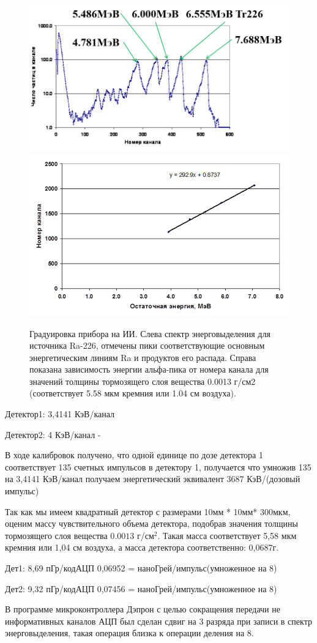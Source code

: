 \begin{figure}
	\centering
	\includegraphics[width=0.49\linewidth]{images/kalibr2}
	\includegraphics[width=0.49\linewidth]{images/kalibr3}
	\caption[Градуировка прибора на ИИ]{Градуировка прибора на ИИ. Слева спектр энерговыделения для источника Ra-226, отмечены пики соответствующие основным энергетическим линиям Ra и продуктов его распада. Справа показана зависимость энергии альфа-пика от номера канала для значений толщины тормозящего слоя вещества 0.0013 г/см2 (соответствует 5.58 мкм кремния или 1.04 см воздуха).	}
	\label{fig:kalibr2}
\end{figure}
Детектор1: 3,4141 КэВ/канал 

Детектор2: 4 КэВ/канал -%





В ходе калибровок получено, что одной единице по дозе детектора 1 соответствует 135 счетных импульсов в детектору 1, получается что умножив 135 на 3,4141  КэВ/канал  получаем энергетический эквивалент 3687 КэВ/(дозовый импульс) 

Так как мы имеем квадратный детектор с размерами 10мм * 10мм* 300мкм, оценим массу чувствительного объема детектора, подобрав значения толщины тормозящего слоя вещества $ 0.0013 $ г/см$^2 $. Такая масса соответствует 5,58 мкм кремния или 1,04 см воздуха, а масса детектора соответственно: 0,0687г.

Дет1: 8,69 пГр/кодАЦП  0,06952 = наноГрей/импульс(умноженное на 8)

Дет2: 9,32 пГр/кодАЦП  0,07456 = наноГрей/импульс(умноженное на 8)


В программе микроконтроллера Дэпрон с целью сокращения передачи не информативных 
каналов АЦП был сделан сдвиг на 3 разряда при записи в спектр энерговыделения, 
такая операция близка к операции деления на 8.

